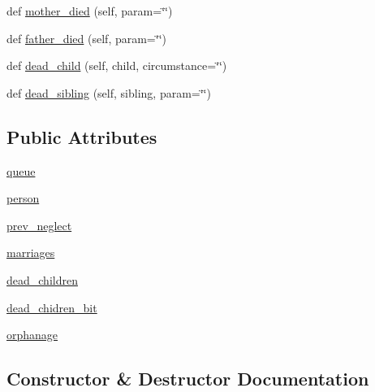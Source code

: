 \begin{DoxyCompactItemize}
\item 
def \hyperlink{classclasses_1_1person_1_1Trigger_ab2be0db77bad18f6aea72fca47093b75}{mother\+\_\+died} (self, param=\char`\"{}\char`\"{})
\item 
def \hyperlink{classclasses_1_1person_1_1Trigger_a97106d2f4ff48e3bacf867095f58b30f}{father\+\_\+died} (self, param=\char`\"{}\char`\"{})
\item 
def \hyperlink{classclasses_1_1person_1_1Trigger_ae9781f0910256f796e06be35e55553f4}{dead\+\_\+child} (self, child, circumstance=\char`\"{}\char`\"{})
\item 
def \hyperlink{classclasses_1_1person_1_1Trigger_a53b782afb7beb24dcc7c82f9dd9eef06}{dead\+\_\+sibling} (self, sibling, param=\char`\"{}\char`\"{})
\end{DoxyCompactItemize}
\subsection*{Public Attributes}
\begin{DoxyCompactItemize}
\item 
\hyperlink{classclasses_1_1person_1_1Trigger_aaaed8678cd8cec7d6037b83fa6163bf5}{queue}
\item 
\hyperlink{classclasses_1_1person_1_1Trigger_af921a5abd6e99f94e2701c14caeaab2e}{person}
\item 
\hyperlink{classclasses_1_1person_1_1Trigger_a8b49e473fc60cf574abf50e16738d069}{prev\+\_\+neglect}
\item 
\hyperlink{classclasses_1_1person_1_1Trigger_a4e81d108c4a1e40154edaec4fb909c7b}{marriages}
\item 
\hyperlink{classclasses_1_1person_1_1Trigger_a5a4e366c8fd954877a9fb4dc8bc266db}{dead\+\_\+children}
\item 
\hyperlink{classclasses_1_1person_1_1Trigger_a8b8109e3e5d3c01129cb60a6f666a60e}{dead\+\_\+chidren\+\_\+bit}
\item 
\hyperlink{classclasses_1_1person_1_1Trigger_a2c33e26bb73aa6dda4fd961c236ca7b9}{orphanage}
\end{DoxyCompactItemize}


\subsection{Constructor \& Destructor Documentation}
\mbox{\label{classclasses_1_1person_1_1Trigger_a067117fe7f2992182b33643c61924d34}} 
